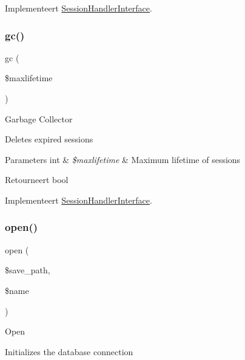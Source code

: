 Implementeert \mbox{\hyperlink{interface_session_handler_interface}{Session\+Handler\+Interface}}.

\mbox{\label{class_c_i___session__database__driver_a57aff7ee0656d8aa75d545fb8b3ae35d}} 
\subsubsection{\texorpdfstring{gc()}{gc()}}
{\footnotesize\ttfamily gc (\begin{DoxyParamCaption}\item[{}]{\$maxlifetime }\end{DoxyParamCaption})}

Garbage Collector

Deletes expired sessions


\begin{DoxyParams}[1]{Parameters}
int & {\em \$maxlifetime} & Maximum lifetime of sessions \\
\hline
\end{DoxyParams}
\begin{DoxyReturn}{Retourneert}
bool 
\end{DoxyReturn}


Implementeert \mbox{\hyperlink{interface_session_handler_interface}{Session\+Handler\+Interface}}.

\mbox{\label{class_c_i___session__database__driver_a614b5cf3840833913c7a73260ed28e02}} 
\subsubsection{\texorpdfstring{open()}{open()}}
{\footnotesize\ttfamily open (\begin{DoxyParamCaption}\item[{}]{\$save\+\_\+path,  }\item[{}]{\$name }\end{DoxyParamCaption})}

Open

Initializes the database connection


